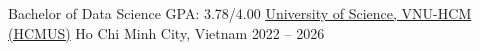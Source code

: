 
\begin{cventries}
  \cventry
    {Bachelor of Data Science \enskip\textbar\enskip GPA: 3.78/4.00}
    {\href{https://en.hcmus.edu.vn/}{University of Science, VNU-HCM (HCMUS)}}
    {Ho Chi Minh City, Vietnam}
    {2022 -- 2026}
    {}
\end{cventries}
